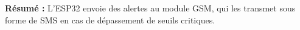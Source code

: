 \textbf{Résumé :}  
L'ESP32 envoie des alertes au module GSM, qui les transmet sous forme de SMS en cas de dépassement de seuils critiques.







